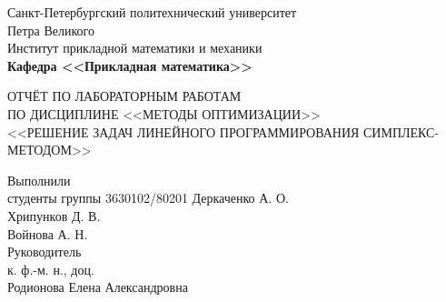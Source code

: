 \documentclass[main.tex]{subfiles}
\begin{document}
\begin{titlepage}
\begin{center}
	\begin{large}
		Санкт-Петербургский политехнический университет\\ Петра Великого\\		
		\vspace{\baselineskip}
		Институт прикладной математики и механики\\
		\textbf{Кафедра <<Прикладная математика>>}\\
	\end{large}
	\vfill
	\Large{{ОТЧЁТ ПО ЛАБОРАТОРНЫМ РАБОТАМ\\
	ПО ДИСЦИПЛИНЕ <<МЕТОДЫ ОПТИМИЗАЦИИ>>\\ <<РЕШЕНИЕ ЗАДАЧ ЛИНЕЙНОГО ПРОГРАММИРОВАНИЯ СИМПЛЕКС-МЕТОДОМ>>}}
\end{center}
\vfill
\flushleft
Выполнили\\
студенты группы 3630102/80201
\flushright
Деркаченко А. О.\\
Хрипунков Д. В.\\
Войнова А. Н.\\ 
\flushleft
Руководитель\\
к. ф.-м. н., доц.\\
\flushright
Родионова Елена Александровна
\vfill
{}
\end{titlepage}
\end{document}

